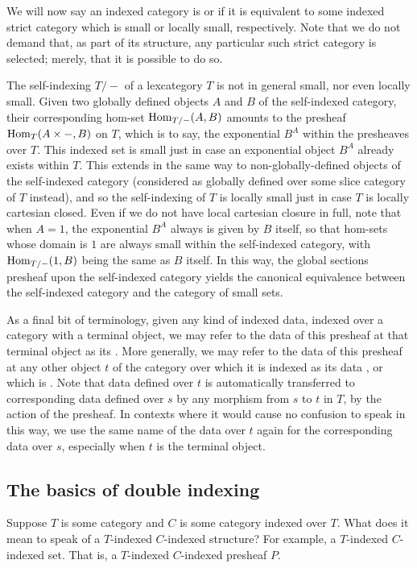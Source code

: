 We will now say an indexed category is  or  if it is equivalent to some indexed strict category which is small or locally small, respectively. Note that we do not demand that, as part of its structure, any particular such strict category is selected; merely, that it is possible to do so.

The self-indexing $T/-$ of a lexcategory $T$ is not in general small, nor even locally small. Given two globally defined objects $A$ and $B$ of the self-indexed category, their corresponding hom-set $\operatorname{Hom}_{T/-}(A, B)$ amounts to the presheaf $\operatorname{Hom}_{T}(A \times -, B)$ on $T$, which is to say, the exponential $B^A$ within the presheaves over $T$. This indexed set is small just in case an exponential object $B^A$ already exists within $T$. This extends in the same way to non-globally-defined objects of the self-indexed category (considered as globally defined over some slice category of $T$ instead), and so the self-indexing of $T$ is locally small just in case $T$ is locally cartesian closed. Even if we do not have local cartesian closure in full, note that when $A = 1$, the exponential $B^A$ always is given by $B$ itself, so that hom-sets whose domain is $1$ are always small within the self-indexed category, with $\operatorname{Hom}_{T/-}(1, B)$ being the same as $B$ itself. In this way, the global sections presheaf upon the self-indexed category yields the canonical equivalence between the self-indexed category and the category of small sets.

As a final bit of terminology, given any kind of indexed data, indexed over a category with a terminal object, we may refer to the data of this presheaf at that terminal object as its . More generally, we may refer to the data of this presheaf at any other object $t$ of the category over which it is indexed as its data , or which is . Note that data defined over $t$ is automatically transferred to corresponding data defined over $s$ by any morphism from $s$ to $t$ in $T$, by the action of the presheaf. In contexts where it would cause no confusion to speak in this way, we use the same name of the data over $t$ again for the corresponding data over $s$, especially when $t$ is the terminal object. 

\subsection{The basics of double indexing}
Suppose $T$ is some category and $C$ is some category indexed over $T$. What does it mean to speak of a $T$-indexed $C$-indexed structure? For example, a $T$-indexed $C$-indexed set. That is, a $T$-indexed $C$-indexed presheaf $P$.


